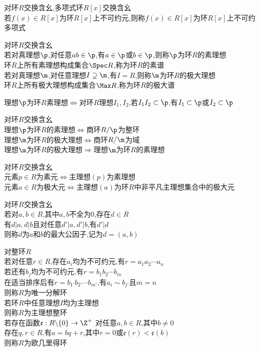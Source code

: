 \begin{zhu}
对环$R$交换含幺,多项式环$R[x]$交换含幺\\
若$f(x)\in R[x]$为环$R[x]$上不可约元,则称$f(x)\in R[x]$为环$R[x]$上不可约多项式
\end{zhu}

\begin{dingyi}
对环$R$交换含幺\\
若对真理想$\p$,对任意$ab\in \p$,有$a\in \p$或$b\in \p$,则称$\p$为环$R$的素理想\\
环$R$上所有素理想构成集合$\Spec R$,称为环$R$的素谱\\
若对真理想$\m$,对任意理想$I\supsetneq \m$,有$I=R$,则称$\m$为环$R$的极大理想\\
环$R$上所有极大理想构成集合$\Max R$,称为环$R$的极大谱
\end{dingyi}

\begin{tuilun}
理想$\p$为环$R$素理想$\Leftrightarrow$对环$R$理想$I_1,I_2$,若$I_1I_2\subset \p$,有$I_1\subset \p$或$I_2\subset \p$
\end{tuilun}

\begin{dingli}
对环$R$交换含幺\\
理想$\p$为环$R$的素理想$\Leftrightarrow$商环$R/\p$为整环\\
理想$\m$为环$R$的极大理想$\Leftrightarrow$商环$R/\m$为域\\
理想$\m$为环$R$的极大理想$\Rightarrow$理想$\m$为环$R$的素理想
\end{dingli}

\begin{dingli}
对环$R$交换含幺\\
元素$p\in R$为素元$\Leftrightarrow$主理想$(p)$为素理想\\
元素$a\in R$为极大元$\Leftrightarrow$主理想$(a)$为环$R$中非平凡主理想集合中的极大元
\end{dingli}

\begin{dingyi}
对环$R$交换含幺\\
若对$a,b\in R$,其中$a,b$不全为$0$,存在$d\in R$\\
有$d|a,d|b$且对任意$d'|a,d'|b$,有$d'|d$\\
则称$d$为$a$和$b$的最大公因子,记为$d=(a,b)$
\end{dingyi}

\begin{dingyi}
对整环$R$\\
若对任意$r\in R$,存在$a_i$均为不可约元,有$r=a_1a_2\cdots a_n$\\
若还有$b_j$均为不可约元,有$r=b_1b_2\cdots b_m$\\
在适当排序后有$r=b_{1'}b_{2'}\cdots b_{m'}$,有$a_i\sim b_{j'}$且$m=n$\\
则称$R$为唯一分解环\\
若环$R$中任意理想$I$均为主理想\\
则称$R$为主理想整环\\
若存在函数$\mathfrak{e}:R\backslash \{0\}\to \Z^{+}$
对任意$a,b\in R$,其中$b\neq 0$\\
存在$q,r\in R$,有$a=bq+r$,其中$r=0$或$\mathfrak{e}(r)<\mathfrak{e}(b)$\\
则称$R$为欧几里得环
\end{dingyi}


